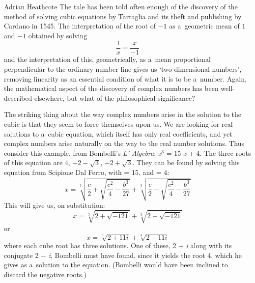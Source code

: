 \begin{artengenv}{Adrian Heathcote}
The tale has been told often enough of the discovery of the method of solving cubic equations by Tartaglia and its theft and publishing by Cardano in 1545. The interpretation of the root of $-1$ as a~geometric mean of $1$ and $-1$ obtained by solving$$\frac{1}{x} = \frac{x}{-1}$$ and the interpretation of this, geometrically, as a~mean proportional perpen\-dicular to the ordinary number line gives us `two-dimensional numbers', removing linearity as an essential condition of what it is to be a~number. Again, the mathematical aspect of the discovery of complex numbers has been well-described elsewhere, but what of the philosophical significance?

The striking thing about the way complex numbers arise in the solution to the cubic is that they seem to force themselves upon us. We are looking for real solutions to a~cubic equation, which itself has only real coefficients, and yet complex numbers arise naturally on the way to the real number solutions. Thus consider this example, from Bombelli's \textit{L' Algebra}: \textit{x}$^{3}$ = 15\textit{ x} + 4.  The three roots of this equation are 4, $-2-\sqrt{3}$, $-2 + \sqrt{3}$. They can be found by solving this equation from Scipione Dal Ferro, with  = 15, and  = 4: $$x = \sqrt[3]{\frac{c}{2} + \sqrt{\frac{c^{2}}{4} - \frac{b^{3}}{27}}} + \sqrt[3]{\frac{c}{2} - \sqrt{\frac{c^{2}}{4} - \frac{b^{3}}{27}}}$$ This will give us, on substitution: $$x = \sqrt[3]{2 + \sqrt{-121}} + \sqrt[3]{2 - \sqrt{-121}}$$ or $$x = \sqrt[3]{2 + 11i} + \sqrt[3]{2 - 11i} $$ where each cube root has three solutions. One of these, 2 + \textit{i} along with its conjugate 2 $-$ \textit{i}, Bombelli must have found, since it yields the root 4, which he gives as a~solution to the equation. (Bombelli would have been inclined to discard the negative roots.) 


\end{artengenv}
